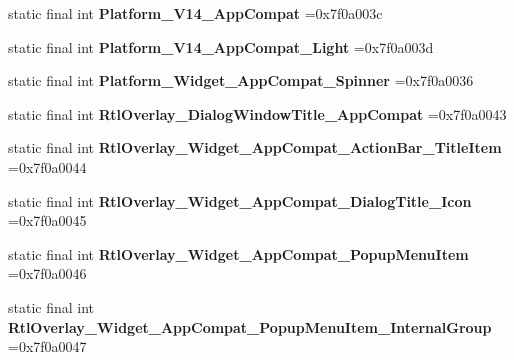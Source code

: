 \begin{DoxyCompactItemize}
static final int {\bfseries Platform\+\_\+\+V14\+\_\+\+App\+Compat} =0x7f0a003c
\item 
\mbox{\label{classproject4_1_1xaria_1_1R_1_1style_a471f5dc3f974605ad8b99923f139bc2a}} 
static final int {\bfseries Platform\+\_\+\+V14\+\_\+\+App\+Compat\+\_\+\+Light} =0x7f0a003d
\item 
\mbox{\label{classproject4_1_1xaria_1_1R_1_1style_a92d1065f988305316ac0f48c2be974f3}} 
static final int {\bfseries Platform\+\_\+\+Widget\+\_\+\+App\+Compat\+\_\+\+Spinner} =0x7f0a0036
\item 
\mbox{\label{classproject4_1_1xaria_1_1R_1_1style_a1d8d7e623ebe2b0a78308c755c188625}} 
static final int {\bfseries Rtl\+Overlay\+\_\+\+Dialog\+Window\+Title\+\_\+\+App\+Compat} =0x7f0a0043
\item 
\mbox{\label{classproject4_1_1xaria_1_1R_1_1style_a71cad65932a458ec5538755145ae4710}} 
static final int {\bfseries Rtl\+Overlay\+\_\+\+Widget\+\_\+\+App\+Compat\+\_\+\+Action\+Bar\+\_\+\+Title\+Item} =0x7f0a0044
\item 
\mbox{\label{classproject4_1_1xaria_1_1R_1_1style_a33edd4f6efb890821055d3f88124cf62}} 
static final int {\bfseries Rtl\+Overlay\+\_\+\+Widget\+\_\+\+App\+Compat\+\_\+\+Dialog\+Title\+\_\+\+Icon} =0x7f0a0045
\item 
\mbox{\label{classproject4_1_1xaria_1_1R_1_1style_a8dcd67d5413fde65cea1d15531c415a8}} 
static final int {\bfseries Rtl\+Overlay\+\_\+\+Widget\+\_\+\+App\+Compat\+\_\+\+Popup\+Menu\+Item} =0x7f0a0046
\item 
\mbox{\label{classproject4_1_1xaria_1_1R_1_1style_a1421b59a546b9bd00e8b098f14b58473}} 
static final int {\bfseries Rtl\+Overlay\+\_\+\+Widget\+\_\+\+App\+Compat\+\_\+\+Popup\+Menu\+Item\+\_\+\+Internal\+Group} =0x7f0a0047
\item 
\mbox{\label{classproject4_1_1xaria_1_1R_1_1style_a7958276bc77c710ddf5dd557cdf2f8c6}} 

\end{DoxyCompactItemize}
